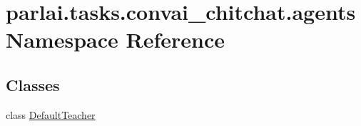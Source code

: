 \hypertarget{namespaceparlai_1_1tasks_1_1convai__chitchat_1_1agents}{}\section{parlai.\+tasks.\+convai\+\_\+chitchat.\+agents Namespace Reference}
\label{namespaceparlai_1_1tasks_1_1convai__chitchat_1_1agents}
\subsection*{Classes}
\begin{DoxyCompactItemize}
\item 
class \hyperlink{classparlai_1_1tasks_1_1convai__chitchat_1_1agents_1_1DefaultTeacher}{Default\+Teacher}
\end{DoxyCompactItemize}
